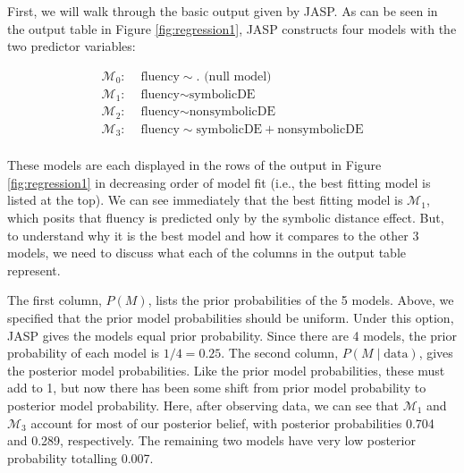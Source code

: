 \documentclass[english,,doc,floatsintext]{apa6}
\begin{document}
First, we will walk through the basic output given by JASP. As can be seen in the output table in Figure \ref{fig:regression1}, JASP constructs four models with the two predictor variables:

\begin{align*}
  \mathcal{M}_0: & \text{ fluency} \sim . \text{ (null model)}\\
  \mathcal{M}_1: & \text{ fluency} \sim \text{symbolicDE}\\
  \mathcal{M}_2: & \text{ fluency} \sim \text{nonsymbolicDE}\\
  \mathcal{M}_3: & \text{ fluency} \sim \text{symbolicDE}+\text{nonsymbolicDE}\\
\end{align*}

These models are each displayed in the rows of the output in Figure \ref{fig:regression1} in decreasing order of model fit (i.e., the best fitting model is listed at the top). We can see immediately that the best fitting model is \(\mathcal{M}_1\), which posits that fluency is predicted only by the symbolic distance effect. But, to understand why it is the best model and how it compares to the other 3 models, we need to discuss what each of the columns in the output table represent.

The first column, \(P(M)\), lists the prior probabilities of the 5 models. Above, we specified that the prior model probabilities should be uniform. Under this option, JASP gives the models equal prior probability. Since there are 4 models, the prior probability of each model is \(1/4 = 0.25\). The second column, \(P(M\mid \text{data})\), gives the posterior model probabilities. Like the prior model probabilities, these must add to 1, but now there has been some shift from prior model probability to posterior model probability. Here, after observing data, we can see that \(\mathcal{M}_1\) and \(\mathcal{M}_3\) account for most of our posterior belief, with posterior probabilities 0.704 and 0.289, respectively. The remaining two models have very low posterior probability totalling 0.007.
\end{document}
